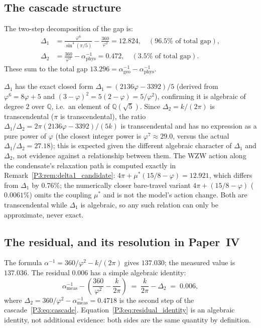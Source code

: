 \documentclass[11pt,a4paper]{article}
\theoremstyle{definition}
\theoremstyle{remark}
\newcommand{\vp}{\varphi}
\newcommand{\aInv}{\alpha^{-1}}
\begin{document}
\subsection{The cascade structure}

The two-step decomposition of the gap is:
\begin{align}
  \Delta_1 &= \frac{\vp^6}{\sin^4(\pi/5)} - \frac{360}{\vp^2}
           = 12.824,
  \quad (96.5\%\text{ of total gap}),
  \label{P3:eq:delta1}\\
  \Delta_2 &= \frac{360}{\vp^2} - \aInv_{\mathrm{phys}}
           = 0.472,
  \quad (3.5\%\text{ of total gap}).
  \label{P3:eq:delta2}
\end{align}
These sum to the total gap $13.296 = \aInv_{\mathrm{geo}} - \aInv_{\mathrm{phys}}$.

$\Delta_1$ has the exact closed form $\Delta_1 = (2136\vp-3392)/5$
(derived from $\vp^6=8\vp+5$ and $(3-\vp)^2=5(2-\vp)=5/\vp^2$), confirming
it is algebraic of degree $2$ over $\mathbb{Q}$, i.e.\ an element of
$\mathbb{Q}(\sqrt5)$. Since $\Delta_2=k/(2\pi)$ is transcendental ($\pi$
is transcendental), the ratio $\Delta_1/\Delta_2 = 2\pi(2136\vp-3392)/(5k)$
is transcendental and has no expression as a pure power of $\vp$ (the
closest integer power is $\vp^7\approx29.0$, versus the actual
$\Delta_1/\Delta_2=27.18$); this is expected given the different
algebraic character of $\Delta_1$ and $\Delta_2$, not evidence against a
relationship between them. The WZW action along the
condensate's relaxation path is computed exactly in
Remark~\ref{P3:rem:delta1_candidate}: $4\pi + \mu^*(15/8-\vp) =
12.921$, which differs from $\Delta_1$ by $0.76\%$; the numerically
closer bare-travel variant $4\pi+(15/8-\vp)$ ($0.0061\%$) omits the
coupling $\mu^*$ and is not the model's action change. Both are
transcendental while $\Delta_1$ is algebraic, so any such relation can
only be approximate, never exact.

\subsection{The residual, and its resolution in Paper~IV}

The formula $\aInv = 360/\vp^2 - k/(2\pi)$ gives $137.030$; the
measured value is $137.036$.  The residual $0.006$ has a simple
algebraic identity:
\begin{equation}
  \aInv_{\mathrm{meas}} - \left(\frac{360}{\vp^2} - \frac{k}{2\pi}\right)
  \;=\; \frac{k}{2\pi} - \Delta_2
  \;=\; 0.006,
  \label{P3:eq:residual_identity}
\end{equation}
where $\Delta_2 = 360/\vp^2 - \aInv_{\mathrm{meas}} = 0.4718$ is the
second step of the cascade~\eqref{P3:eq:cascade}.
Equation~\eqref{P3:eq:residual_identity} is an algebraic identity, not
additional evidence: both sides are the same quantity by definition.
\end{document}
